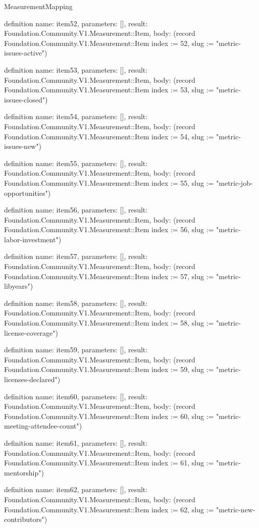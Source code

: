 \begin{lexlean}{MeasurementMapping}
\begin{semanticmodule}
definition{
  name: item52,
  parameters: [],
  result: Foundation.Community.V1.Measurement::Item,
  body: (record Foundation.Community.V1.Measurement::Item {index := 52, slug := "metric-issues-active"})
}

definition{
  name: item53,
  parameters: [],
  result: Foundation.Community.V1.Measurement::Item,
  body: (record Foundation.Community.V1.Measurement::Item {index := 53, slug := "metric-issues-closed"})
}

definition{
  name: item54,
  parameters: [],
  result: Foundation.Community.V1.Measurement::Item,
  body: (record Foundation.Community.V1.Measurement::Item {index := 54, slug := "metric-issues-new"})
}

definition{
  name: item55,
  parameters: [],
  result: Foundation.Community.V1.Measurement::Item,
  body: (record Foundation.Community.V1.Measurement::Item {index := 55, slug := "metric-job-opportunities"})
}

definition{
  name: item56,
  parameters: [],
  result: Foundation.Community.V1.Measurement::Item,
  body: (record Foundation.Community.V1.Measurement::Item {index := 56, slug := "metric-labor-investment"})
}

definition{
  name: item57,
  parameters: [],
  result: Foundation.Community.V1.Measurement::Item,
  body: (record Foundation.Community.V1.Measurement::Item {index := 57, slug := "metric-libyears"})
}

definition{
  name: item58,
  parameters: [],
  result: Foundation.Community.V1.Measurement::Item,
  body: (record Foundation.Community.V1.Measurement::Item {index := 58, slug := "metric-license-coverage"})
}

definition{
  name: item59,
  parameters: [],
  result: Foundation.Community.V1.Measurement::Item,
  body: (record Foundation.Community.V1.Measurement::Item {index := 59, slug := "metric-licenses-declared"})
}

definition{
  name: item60,
  parameters: [],
  result: Foundation.Community.V1.Measurement::Item,
  body: (record Foundation.Community.V1.Measurement::Item {index := 60, slug := "metric-meeting-attendee-count"})
}

definition{
  name: item61,
  parameters: [],
  result: Foundation.Community.V1.Measurement::Item,
  body: (record Foundation.Community.V1.Measurement::Item {index := 61, slug := "metric-mentorship"})
}

definition{
  name: item62,
  parameters: [],
  result: Foundation.Community.V1.Measurement::Item,
  body: (record Foundation.Community.V1.Measurement::Item {index := 62, slug := "metric-new-contributors"})
}


\end{semanticmodule}
\end{lexlean}

